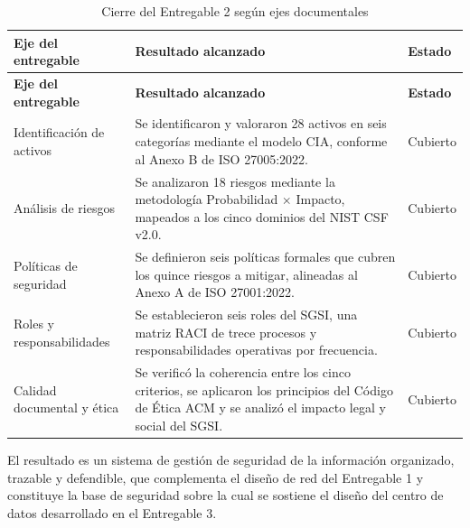 \documentclass[11pt, a4paper, oneside]{report}
\begin{document}
\begin{xltabular}{\textwidth}{@{}|L{3.6cm}|X|L{2.2cm}|@{}}
\caption{Cierre del Entregable 2 según ejes documentales}
\label{tab:cierre_entregable2_ejes} \\

\parbox[c][1.1cm][c]{\linewidth}{\centering\color{white}\bfseries\small Eje del entregable} &
\parbox[c][1.1cm][c]{\linewidth}{\centering\color{white}\bfseries\small Resultado alcanzado} &
\parbox[c][1.1cm][c]{\linewidth}{\centering\color{white}\bfseries\small Estado} \\ \hline
\endfirsthead

\parbox[c][1.1cm][c]{\linewidth}{\centering\color{white}\bfseries\small Eje del entregable} &
\parbox[c][1.1cm][c]{\linewidth}{\centering\color{white}\bfseries\small Resultado alcanzado} &
\parbox[c][1.1cm][c]{\linewidth}{\centering\color{white}\bfseries\small Estado} \\ \hline
\endhead

\hline
\endfoot

{\small Identificación de activos} & {\small Se identificaron y valoraron 28 activos en seis categorías mediante el modelo CIA, conforme al Anexo B de ISO 27005:2022.} & {\small Cubierto} \\ \hline
{\small Análisis de riesgos} & {\small Se analizaron 18 riesgos mediante la metodología Probabilidad \(\times\) Impacto, mapeados a los cinco dominios del NIST CSF v2.0.} & {\small Cubierto} \\ \hline
{\small Políticas de seguridad} & {\small Se definieron seis políticas formales que cubren los quince riesgos a mitigar, alineadas al Anexo A de ISO 27001:2022.} & {\small Cubierto} \\ \hline
{\small Roles y responsabilidades} & {\small Se establecieron seis roles del SGSI, una matriz RACI de trece procesos y responsabilidades operativas por frecuencia.} & {\small Cubierto} \\ \hline
{\small Calidad documental y ética} & {\small Se verificó la coherencia entre los cinco criterios, se aplicaron los principios del Código de Ética ACM y se analizó el impacto legal y social del SGSI.} & {\small Cubierto} \\ \hline

\end{xltabular}

\normalsize

El resultado es un sistema de gestión de seguridad de la información organizado, trazable y defendible, que complementa el diseño de red del Entregable 1 y constituye la base de seguridad sobre la cual se sostiene el diseño del centro de datos desarrollado en el Entregable 3.
\end{document}
